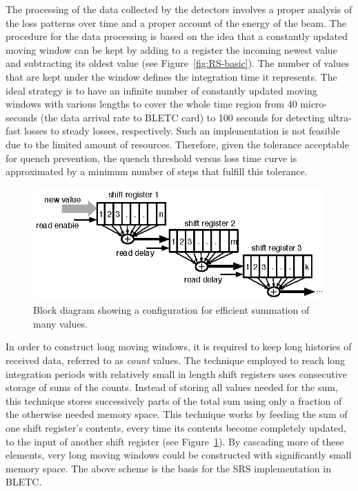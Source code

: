 \documentclass{llncs}
\begin{document}
The processing of the data collected by the detectors involves a proper analysis of the loss patterns over time and a proper account of the energy of the beam. The procedure for the data processing is based on the idea that a constantly updated moving window can be kept by adding to a register the incoming newest value and subtracting its oldest value (see Figure~\ref{fig:RS-basic}). The number of values that are kept under the window defines the integration time it represents.  The ideal strategy is to have an infinite number of constantly updated moving windows with various lengths to cover the whole time region from 40 micro-seconds (the data arrival rate to BLETC card)  to 100 seconds for detecting ultra-fast losses to steady losses, respectively. Such an implementation is not feasible due to the limited amount of resources. Therefore, given the tolerance acceptable for quench prevention, the quench threshold versus loss time curve is approximated by a minimum number of steps that fulfill this tolerance.

\begin{figure}[t]
  \centering \includegraphics{SRS-basic.eps}
   \caption{Block diagram showing a configuration for efficient summation of many values.}
  \label{fig:SRS-basic}
\end{figure}


In order to construct long moving windows, it is required to keep long histories of received data, referred to as \emph{count} values. The technique employed to reach long integration periods with relatively small in length shift registers uses consecutive storage of sums of the counts. Instead of storing all values needed for the sum, this technique stores successively parts of the total sum using only a fraction of the otherwise needed memory space. This technique works by feeding the sum of one shift register's contents, every time its contents become completely updated, to the input of another shift register (see Figure~\ref{fig:SRS-basic}). By cascading more of these elements, very long moving windows could be constructed with significantly small memory space. The above scheme is the basis for the SRS implementation in BLETC.
\end{document}

